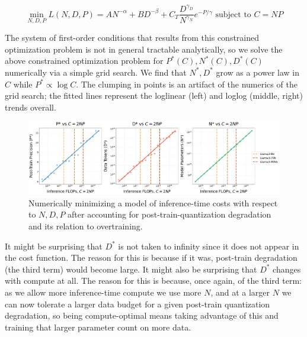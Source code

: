 \documentclass[11pt]{article}
\begin{document}
%
\begin{equation}\label{inf-cost}
    \min_{N, D, P} L(N, D, P) = AN^{-\alpha} + BD^{-\beta} + C_T\frac{D^{\gamma_D}}{N^{\gamma_N}}e^{-P/\gamma} \text { subject to } C = NP 
\end{equation}

The system of first-order conditions that results from this constrained optimization problem is not in general tractable analytically, so we solve the above constrained optimization problem for $P^*(C), N^*(C), D^*(C)$ numerically via a simple grid search. We find that $N^*, D^*$ grow as a power law in $C$ while $P^* \propto \log C$. The clumping in points is an artifact of the numerics of the grid search; the fitted lines represent the loglinear (left) and loglog (middle, right) trends overall. 

\begin{figure}
    \centering
    \includegraphics[width=\linewidth]{inference_cost_model.pdf}
    \caption{{Numerically minimizing a model of inference-time costs with respect to $N, D, P$ after accounting for post-train-quantization degradation and its relation to overtraining.}}
    \label{fig:enter-label}
\end{figure}

It might be surprising that $D^*$ is not taken to infinity since it does not appear in the cost function. The reason for this is because if it was, post-train degradation (the third term) would become large. It might also be surprising that $D^*$ changes with compute at all. The reason for this is because, once again, of the third term: as we allow more inference-time compute we use more $N$, and at a larger $N$ we can now tolerate a larger data budget for a given post-train quantization degradation, so being compute-optimal means taking advantage of this and training that larger parameter count on more data. 
\end{document}

